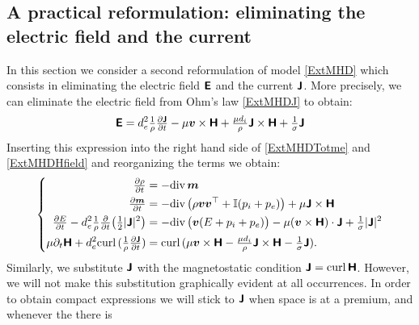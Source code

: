 \documentclass[preprint,1p]{elsarticle}
\begin{document}

\subsection{A practical reformulation: eliminating the electric
field and the current}\label{EliminationOfEfield}

In this section we consider a second reformulation of model
\eqref{ExtMHD} which consists in eliminating the electric field $\boldsymbol{\mathsf{E}}$
and the current $\boldsymbol{\mathsf{J}}$. More precisely, we can eliminate the electric
field from Ohm's law \eqref{ExtMHDJ} to obtain:
\begin{align*}
\boldsymbol{\mathsf{E}} = d_e^2 \tfrac{1}{\rho} \tfrac{\partial \boldsymbol{\mathsf{J}}}{\partial t}
- \mu \boldsymbol{v} \times \boldsymbol{\mathsf{H}}
+ \tfrac{\mu d_i}{\rho} \boldsymbol{\mathsf{J}} \times \boldsymbol{\mathsf{H}}
+ \tfrac{1}{\sigma} \boldsymbol{\mathsf{J}}
\end{align*}
Inserting this expression into the right hand side of
\eqref{ExtMHDTotme} and \eqref{ExtMHDHfield} and reorganizing the terms
we obtain:
\begin{align}
\label{ExtMHDNoElec}
\left\{
\begin{aligned}
\tfrac{\partial \rho}{\partial t} &= - \diver{}\mom \\
%
\tfrac{\partial \mom}{\partial t}
&=
- \diver{}
\big( \rho \vel\vel^\transp
+ \mathbb{I} (p_i + p_e) \big)
+ \mu \current \times \Hfield \\
%
\tfrac{\partial \totme}{\partial t}
- d_e^2 \tfrac{1}{\rho} \tfrac{\partial}{\partial t}\big(
\tfrac{1}{2}|\current|^2\big)
&=
- \diver{}\big( \vel (\totme + p_i +
p_e) \big)
- \mu (\vel \times \Hfield) \cdot\current
+ \tfrac{1}{\conduct} |\current|^2  \\
%
\mu \partial_t \Hfield
+ d_e^2 \curl{}( \tfrac{1}{\rho} \tfrac{\partial \current}{\partial t})
&= \curl{}(\mu \vel \times \Hfield
- \tfrac{\mu d_i}{\rho} \current \times \Hfield
- \tfrac{1}{\conduct} \current) .
\end{aligned}
\right.
\end{align}
Similarly, we substitute $\boldsymbol{\mathsf{J}}$ with the magnetostatic condition $\boldsymbol{\mathsf{J}} =
\text{curl} \, \mathbf{}\boldsymbol{\mathsf{H}}$. However, we will not make this substitution graphically
evident at all occurrences. In order to obtain compact expressions we will
stick to $\boldsymbol{\mathsf{J}}$ when space is at a premium, and whenever the there is
\end{document}
